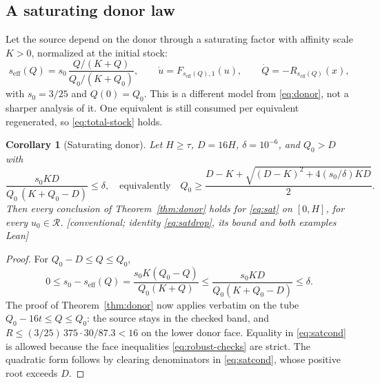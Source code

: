 \documentclass[11pt,a4paper]{article}
\theoremstyle{plain}
\newtheorem{corollary}[theorem]{Corollary}
\theoremstyle{definition}
\theoremstyle{remark}
\newcommand{\RR}{\mathcal R}
\newcommand{\evid}[1]{\textnormal{\textsf{\small[#1]}}}
\begin{document}
\subsection{A saturating donor law}\label{sec:saturating}
Let the source depend on the donor through a saturating factor with affinity
scale $K>0$, normalized at the initial stock:
\begin{equation}\label{eq:sat}
s_{\mathrm{eff}}(Q)=s_0\,\frac{Q/(K+Q)}{Q_0/(K+Q_0)},\qquad
\dot u=F_{s_{\mathrm{eff}}(Q),1}(u),\qquad\dot Q=-R_{s_{\mathrm{eff}}(Q)}(x),
\end{equation}
with $s_0=3/25$ and $Q(0)=Q_0$. This is a different model from
\eqref{eq:donor}, not a sharper analysis of it. One equivalent is still
consumed per equivalent regenerated, so \eqref{eq:total-stock} holds.

\begin{corollary}[Saturating donor]\label{cor:saturating}
Let $H\ge\tau$, $D=16H$, $\delta=10^{-6}$, and $Q_0>D$ with
\begin{equation}\label{eq:satcond}
\frac{s_0KD}{Q_0\,(K+Q_0-D)}\le\delta,
\quad\text{equivalently}\quad
Q_0\ge\frac{D-K+\sqrt{(D-K)^2+4(s_0/\delta)KD}}{2}.
\end{equation}
Then every conclusion of Theorem~\ref{thm:donor} holds for \eqref{eq:sat} on
$[0,H]$, for every $u_0\in\RR$. \evid{conventional; identity
\eqref{eq:satdrop}, its bound and both examples Lean}
\end{corollary}
\begin{proof}
For $Q_0-D\le Q\le Q_0$,
\begin{equation}\label{eq:satdrop}
0\le s_0-s_{\mathrm{eff}}(Q)=\frac{s_0K(Q_0-Q)}{Q_0(K+Q)}\le\frac{s_0KD}{Q_0(K+Q_0-D)}\le\delta .
\end{equation}
The proof of Theorem~\ref{thm:donor} now applies verbatim on the tube
$Q_0-16t\le Q\le Q_0$: the source stays in the checked band, and
$R\le(3/25)\,375\cdot30/87.3<16$ on the lower donor face. Equality in
\eqref{eq:satcond} is allowed because the face inequalities
\eqref{eq:robust-checks} are strict. The quadratic form follows by clearing
denominators in \eqref{eq:satcond}, whose positive root exceeds $D$.
\end{proof}
\end{document}
